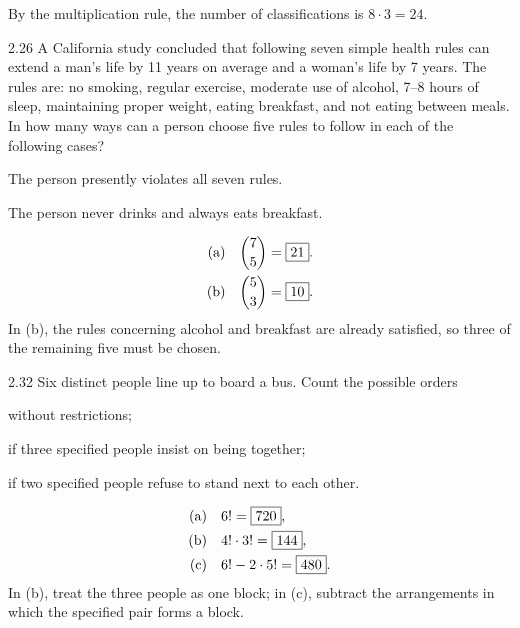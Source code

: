 \documentclass[11pt,oneside]{article}
\begin{document}
\begin{solution}
By the multiplication rule, the number of classifications is $8\cdot3=\boxed{24}$.
\end{solution}

\begin{exercise}{2.26}
A California study concluded that following seven simple health rules can extend a man's life by 11 years on average and a woman's life by 7 years. The rules are: no smoking, regular exercise, moderate use of alcohol, 7--8 hours of sleep, maintaining proper weight, eating breakfast, and not eating between meals. In how many ways can a person choose five rules to follow in each of the following cases?
\par
\begin{exercisesubparts}
\item The person presently violates all seven rules.
\item The person never drinks and always eats breakfast.
\end{exercisesubparts}
\end{exercise}

\begin{solution}
\begin{align*}
\textup{(a)}\quad&\binom{7}{5}=\boxed{21}.\\
\textup{(b)}\quad&\binom{5}{3}=\boxed{10}.
\end{align*}
In (b), the rules concerning alcohol and breakfast are already satisfied, so three of the remaining five must be chosen.
\end{solution}

\begin{exercise}{2.32}
Six distinct people line up to board a bus. Count the possible orders
\par
\begin{exercisesubparts}
\item without restrictions;
\item if three specified people insist on being together;
\item if two specified people refuse to stand next to each other.
\end{exercisesubparts}
\end{exercise}

\begin{solution}
\begin{align*}
\textup{(a)}\quad&6!=\boxed{720},\\
\textup{(b)}\quad&4!\cdot3!=\boxed{144},\\
\textup{(c)}\quad&6!-2\cdot5!=\boxed{480}.
\end{align*}
In (b), treat the three people as one block; in (c), subtract the arrangements in which the specified pair forms a block.
\end{solution}
\end{document}
